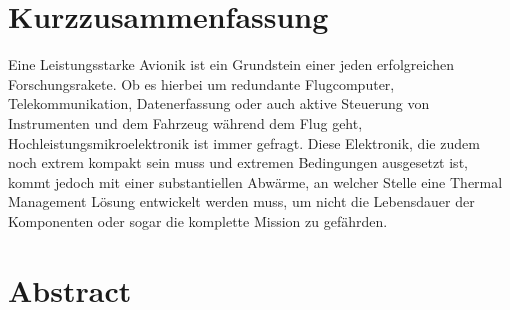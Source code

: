 \chapter*{Kurzzusammenfassung} %
\label{chap:Kurzzusammenfassung}


Eine Leistungsstarke Avionik ist ein Grundstein einer jeden erfolgreichen Forschungsrakete.
Ob es hierbei um redundante Flugcomputer, Telekommunikation, Datenerfassung oder auch aktive Steuerung von Instrumenten und dem Fahrzeug während
dem Flug geht, Hochleistungsmikroelektronik ist immer gefragt. Diese Elektronik, die zudem noch extrem kompakt sein muss und extremen
Bedingungen ausgesetzt ist, kommt jedoch mit einer substantiellen Abwärme, an welcher Stelle eine Thermal Management Lösung entwickelt
werden muss, um nicht die Lebensdauer der Komponenten oder sogar die komplette Mission zu gefährden.


\chapter*{Abstract} %
\label{chap:Abstract}
